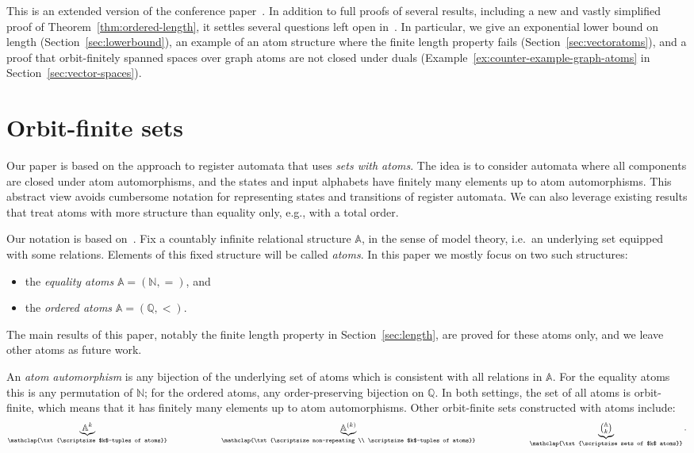 \documentclass{theoretics}
\newcommand{\Nat}{{\mathbb N}}
\newcommand{\Rat}{{\mathbb Q}}
\newcommand{\myunderbrace}[2]{\underbrace{#1}_{\mathclap{\txt{\scriptsize #2}}}}
\newcommand{\atoms}{\mathbb A}
\begin{document}
This is an extended version of the conference paper~\cite{lics21}. In addition to full proofs of several results, including a new and vastly simplified proof of Theorem~\ref{thm:ordered-length}, it settles several questions left open in~\cite{lics21}. In particular, we give an exponential lower bound on length (Section~\ref{sec:lowerbound}), an example of an atom structure where the finite length property fails (Section~\ref{sec:vectoratoms}), and a proof that orbit-finitely spanned spaces over graph atoms are not closed under duals (Example~\ref{ex:counter-example-graph-atoms} in Section~\ref{sec:vector-spaces}).

\section{Orbit-finite sets}
\label{sec:atoms}

Our paper is based on the approach to register automata that uses \emph{sets with atoms}. The idea is to consider automata where all components are closed under atom automorphisms, and the states and input alphabets have finitely many elements up to atom automorphisms. This abstract view avoids cumbersome notation for representing states and transitions of register automata. We can also leverage existing results that treat atoms with more structure than equality only, e.g., with a total order.

 Our notation is based on~\cite{bojanczyk_slightly2018}. 
Fix a countably infinite relational structure $\atoms$, in the sense of model theory, i.e.~an underlying set equipped with some relations. Elements of this fixed structure will be called \emph{atoms}. In this paper we  mostly focus on two such structures:
\begin{itemize}
\item the {\em equality atoms} $\atoms=(\Nat,=)$, and
\item the {\em ordered atoms} $\atoms=(\Rat,<)$.
\end{itemize}
The main results of this paper, notably the finite length property in Section~\ref{sec:length}, are proved  for these atoms only, and we leave other atoms as future work.

An \emph{atom automorphism}  is any bijection of the underlying set of atoms which is consistent with all relations in $\atoms$. For the equality atoms this is any permutation of $\Nat$; for the ordered atoms, any order-preserving bijection on $\Rat$. 
In both settings, the set of all atoms is orbit-finite, which means that it has finitely many elements up to atom automorphisms. Other orbit-finite sets constructed with atoms include:
\begin{align}\label{eq:examples-of-orbit-finite}
\myunderbrace{\atoms^k}{$k$-tuples of atoms} 
\qquad  \qquad \qquad \myunderbrace{\atoms^{(k)}}{non-repeating \\
\scriptsize $k$-tuples of atoms} \qquad \qquad  \qquad
\myunderbrace{\textstyle{\atoms \choose k}}{sets of $k$ atoms}.
\end{align}
\end{document}
